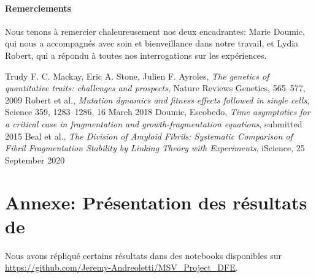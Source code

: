 \documentclass[12pt]{article}
\begin{document}
  \paragraph{Remerciements}
  
Nous tenons à remercier chaleureusement nos deux encadrantes: Marie Doumic, qui nous a accompagnés avec soin et bienveillance dans notre travail, et Lydia Robert, qui a répondu à toutes nos interrogations sur les expériences.
  
\newpage

\begin{thebibliography}{1}

  Trudy F. C. Mackay, Eric A. Stone, Julien F. Ayroles,
  \emph{The genetics of quantitative traits: challenges and prospects}, Nature Reviews Genetics, 565–577, 2009
  Robert et al.,
  \emph{Mutation dynamics and fitness effects followed in single cells}, Science 359, 1283–1286, 16 March 2018
  Doumic, Escobedo,
  \emph{Time asymptotics for a critical case in fragmentation and growth-fragmentation equations}, submitted 2015
  Beal et al.,
  \emph{The Division of Amyloid Fibrils: Systematic Comparison of Fibril Fragmentation Stability by Linking Theory with Experiments}, iScience, 25 September 2020
\end{thebibliography}





\newpage

\appendix

\FloatBarrier
\section{Annexe: Présentation des résultats de \cite{rob}}\label{ann:resultats}

Nous avons répliqué certains résultats dans des notebooks disponibles sur \url{https://github.com/Jeremy-Andreoletti/MSV_Project_DFE}.
%
\end{document}
